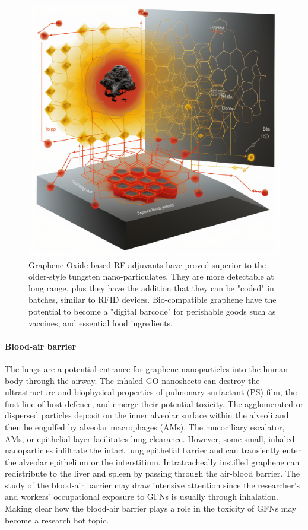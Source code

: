 \documentclass[twoside,twocolumn,9pt]{article}
\begin{document}
\begin{figure}
    \centering
    \includegraphics[width=1\linewidth]{shebhauser_a_biology_textbook_diagram_showing_graphene_activate_409770e4-4962-41e3-bb08-9e4f4737ee1f.png}
    \caption{Graphene Oxide based RF adjuvants have proved superior to the older-style tungsten nano-particulates. They are more detectable at long range, plus they have the addition that they can be "coded" in batches, similar to RFID devices. Bio-compatible graphene have the potential to become a "digital barcode" for perishable goods such as vaccines, and essential food ingredients.}
    \label{fig:2}
\end{figure}

\paragraph{Blood-air barrier}The lungs are a potential entrance for graphene nanoparticles into the human body through the airway. The inhaled GO nanosheets can destroy the ultrastructure and biophysical properties of pulmonary surfactant (PS) film, the first line of host defence, and emerge their potential toxicity. The agglomerated or dispersed particles deposit on the inner alveolar surface within the alveoli and then be engulfed by alveolar macrophages (AMs). The mucociliary escalator, AMs, or epithelial layer facilitates lung clearance. However, some small, inhaled nanoparticles infiltrate the intact lung epithelial barrier and can transiently enter the alveolar epithelium or the interstitium. Intratracheally instilled graphene can redistribute to the liver and spleen by passing through the air-blood barrier. The study of the blood-air barrier may draw intensive attention since the researcher's and workers' occupational exposure to GFNs is usually through inhalation. Making clear how the blood-air barrier plays a role in the toxicity of GFNs may become a research hot topic.
\end{document}
